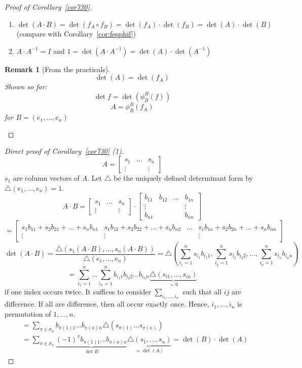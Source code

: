 \documentclass{article}
\newcounter{lecref}[section]
\numberwithin{lecref}{section}
\newtheorem{remark}[lecref]{Remark}
\begin{document}
\begin{proof}[Proof of Corollary~\ref{cor730}]
  \begin{enumerate}
    \item $\det(A \cdot B) = \det(f_A \circ f_B) = \det(f_A) \cdot \det(f_B) = \det(A) \cdot \det(B)$ (compare with Corollary~\ref{cor:feqphif})
    \item $A \cdot A^{-1} = I$ and $1 = \det(A \cdot A^{-1}) = \det(A) \cdot \det(A^{-1})$
  \end{enumerate}
  \begin{remark}[From the practicals]
    \[ \det(A) = \det(f_A) \]
    Shown so far:
    \[ \det{f} = \det\left(\phi_B^B(f)\right) \]
    \[ A = \phi_B^B\left(f_A\right) \]
    for $B = (e_1, \dots, e_n)$
  \end{remark}
\end{proof}

\begin{proof}[Direct proof of Corollary~\ref{cor730} (1)]
  \[ A = \begin{bmatrix} s_1 & \dots & s_n \\ \vdots &  & \vdots \end{bmatrix} \]
  $s_1$ are column vectors of $A$.
  Let $\triangle$ be the uniquely defined determinant form by $\triangle(e_1, \dots, e_n) = 1$.
  \[
    A \cdot B
    = \begin{bmatrix} s_1 & \dots & s_n \\ \vdots &  & \vdots \end{bmatrix} \cdot \begin{bmatrix} b_{11} & b_{12} & \dots & b_{1n} \\ \vdots & & & \vdots \\ b_{n1} & & & b_{nn} \end{bmatrix}
  \] \[
    = \begin{bmatrix} s_1 b_{11} + s_2 b_{21} + \dots + s_n b_{n1} & s_1 b_{12} + s_2 b_{22} + \dots + s_n b_{n2} & \dots & s_1 b_{1n} + s_2 b_{2n} + \dots + s_n b_{nn} \\
    \vdots & \vdots &  & \vdots \end{bmatrix}
  \] \[
    \det(A \cdot B) = \frac{\triangle(s_1(A \cdot B), \dots, s_n(A \cdot B))}{\triangle (e_1, \dots, e_n)}
      = \triangle\left(\sum_{i_1=1}^n s_{i_1} b_{i_1 1}, \sum_{i_2=1}^n s_{i_2} b_{i_2 2}, \dots, \sum_{i_n=1}^n s_{i_n} b_{i_n n}\right)
  \] \[
    = \sum_{i_1=1}^n \dots \sum_{i_n=1}^n b_{i_1 1} b_{i_2 2} \dots b_{i_n n} \underbrace{\triangle(s_{i1}, \dots, s_{in})}_{=0}
  \]
  if one index occurs twice. It suffices to consider $\sum_{i_1,\dots,i_n}$ such that all $ij$ are difference.
  If all are difference, then all occur exactly once. Hence,
  $i_1,\dots,i_n$ is permutation of $1, \dots, n$.
  \begin{align*}
    &= \sum_{\pi \in \sigma_n} b_{\pi(1) 1} \dots b_{\pi(n) n} \triangle(s_{\pi(1)} \dots s_{\pi(n)}) \\
    &= \sum_{\pi \in \sigma_n} \underbrace{(-1)^\pi b_{\pi(1) 1} \dots b_{\pi(n) n}}_{\det{B}} \underbrace{\triangle(s_1, \dots, s_n)}_{= \det(A)} = \det(B) \cdot \det(A)
  \end{align*}
\end{proof}
\end{document}
